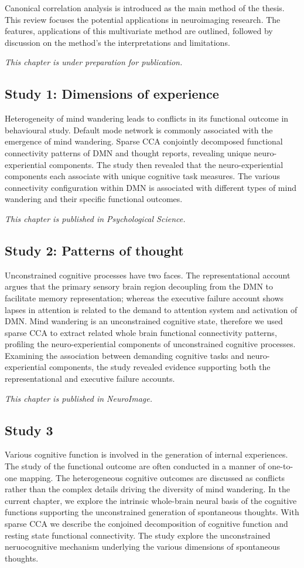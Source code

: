 Canonical correlation analysis is introduced as the main method of the thesis. This review focuses the potential applications in neuroimaging research. The features, applications of this multivariate method are outlined, followed by discussion on the method's the interpretations and limitations. 

\textit{This chapter is under preparation for publication. } 

\subsection*{Study 1: Dimensions of experience}
Heterogeneity of mind wandering leads to conflicts in its functional outcome in behavioural study. Default mode network is commonly associated with the emergence of mind wandering. Sparse CCA conjointly decomposed functional connectivity patterns of DMN and thought reports, revealing unique neuro-experiential components. The study then revealed that the neuro-experiential components each associate with unique cognitive task measures. The various connectivity configuration within DMN is associated with different types of mind wandering and their specific functional outcomes.

\textit{This chapter is published in Psychological Science.}

\subsection*{Study 2: Patterns of thought}
Unconstrained cognitive processes have two faces. The representational account argues that the primary sensory brain region decoupling from the DMN to facilitate memory representation; whereas the executive failure account shows lapses in attention is related to the demand to attention system and activation of DMN. Mind wandering is an unconstrained cognitive state, therefore we used sparse CCA to extract related whole brain functional connectivity patterns, profiling the neuro-experiential components of unconstrained cognitive processes. Examining the association between demanding cognitive tasks and neuro-experiential components, the study revealed evidence supporting both the representational and executive failure accounts.

\textit{This chapter is published in NeuroImage.}

\subsection*{Study 3}
Various cognitive function is involved in the generation of internal experiences. The study of the functional outcome are often conducted in a manner of one-to-one mapping. The heterogeneous cognitive outcomes are discussed as conflicts rather than the complex details driving the diversity of mind wandering. In the current chapter, we explore the intrinsic whole-brain neural basis of the cognitive functions supporting the unconstrained generation of spontaneous thoughts.  With sparse CCA we describe the conjoined decomposition of cognitive function and resting state functional connectivity. The study explore the unconstrained neruocognitive mechanism underlying the various dimensions of spontaneous thoughts.


